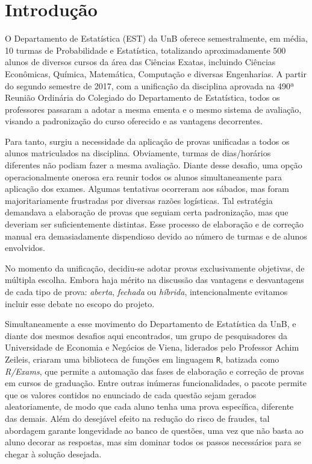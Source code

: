 \documentclass[a4paper]{report}
\title{}
\author{}
\date{}
\begin{document}




\tableofcontents

\newpage

\BgThispage
\chapter{Introdução}

\newpage

O Departamento de Estatística (EST) da UnB oferece semestralmente, em
média, 10 turmas de Probabilidade e Estatística, totalizando
aproximadamente 500 alunos de diversos cursos da área das Ciências
Exatas, incluindo Ciências Econômicas, Química, Matemática, Computação e
diversas Engenharias. A partir do segundo semestre de 2017, com a
unificação da disciplina aprovada na 490ª Reunião Ordinária do Colegiado
do Departamento de Estatística, todos os professores passaram a adotar a
mesma ementa e o mesmo sistema de avaliação, visando a padronização do
curso oferecido e as vantagens decorrentes.

Para tanto, surgiu a necessidade da aplicação de provas unificadas a
todos os alunos matriculados na disciplina. Obviamente, turmas de
dias/horários diferentes não podiam fazer a mesma avaliação. Diante
desse desafio, uma opção operacionalmente onerosa era reunir todos os
alunos simultaneamente para aplicação dos exames. Algumas tentativas
ocorreram aos sábados, mas foram majoritariamente frustradas por
diversas razões logísticas. Tal estratégia demandava a elaboração de
provas que seguiam certa padronização, mas que deveriam ser
suficientemente distintas. Esse processo de elaboração e de correção
manual era demasiadamente dispendioso devido ao número de turmas e de
alunos envolvidos.

No momento da unificação, decidiu-se adotar provas exclusivamente
objetivas, de múltipla escolha. Embora haja mérito na discussão das
vantagens e desvantagens de cada tipo de prova: \emph{aberta},
\emph{fechada} ou \emph{híbrida}, intencionalmente evitamos incluir esse
debate no escopo do projeto.

Simultaneamente a esse movimento do Departamento de Estatística da UnB,
e diante dos mesmos desafios aqui encontrados, um grupo de pesquisadores
da Universidade de Economia e Negócios de Viena, liderados pelo
Professor Achim Zeileis, criaram uma biblioteca de funções em linguagem
\texttt{R}, batizada como \emph{R/Exams}, que permite a automação das
fases de elaboração e correção de provas em cursos de graduação. Entre
outras inúmeras funcionalidades, o pacote permite que os valores
contidos no enunciado de cada questão sejam gerados aleatoriamente, de
modo que cada aluno tenha uma prova específica, diferente das demais.
Além do desejável efeito na redução do risco de fraudes, tal abordagem
garante longevidade ao banco de questões, uma vez que não basta ao aluno
decorar as respostas, mas sim dominar todos os passos necessários para
se chegar à solução desejada.
\end{document}
